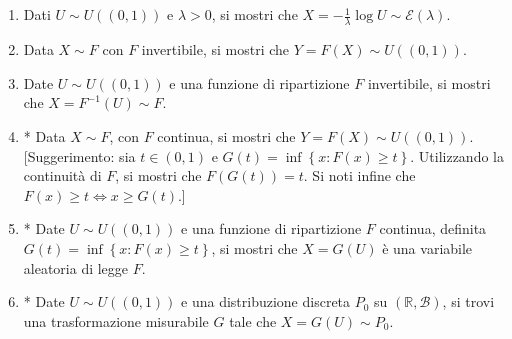 \subsection{}
\begin{enumerate}
\item Dati $U\sim U(( 0,1))$ e $\lambda  >0$, si mostri che $X=-\frac{1}{\lambda }\log U\sim \mathcal{E}( \lambda )$.
\item Data $X\sim F$ con $F$ invertibile, si mostri che $Y=F( X) \sim U(( 0,1))$.
\item Date $U\sim U(( 0,1))$ e una funzione di ripartizione $F$ invertibile, si mostri che $X=F^{-1}( U) \sim F$.
\item * Data $X\sim F$, con $F$ continua, si mostri che $Y=F( X) \sim U(( 0,1))$. [Suggerimento: sia $t\in \left( 0,1\right)$ e $G\left( t\right) =\inf\left\{x:F\left( x\right) \geq t\right\}$. Utilizzando la continuità di $F$, si mostri che $F\left( G\left( t\right)\right) =t$. Si noti infine che $F\left( x\right) \geq t\iff x\geq G\left( t\right)$.]
\item * Date $U\sim U\left(\left( 0,1\right)\right)$ e una funzione di ripartizione $F$ continua, definita $G\left( t\right) =\inf\left\{x:F\left( x\right) \geq t\right\}$, si mostri che $X=G\left( U\right)$ è una variabile aleatoria di legge $F$.
\item * Date $U\sim U(( 0,1))$ e una distribuzione discreta $P_{0}$ su $\left(\mathbb{R} ,\mathcal{B}\right)$, si trovi una trasformazione misurabile $G$ tale che $X=G\left( U\right) \sim P_{0}$.
\end{enumerate}
